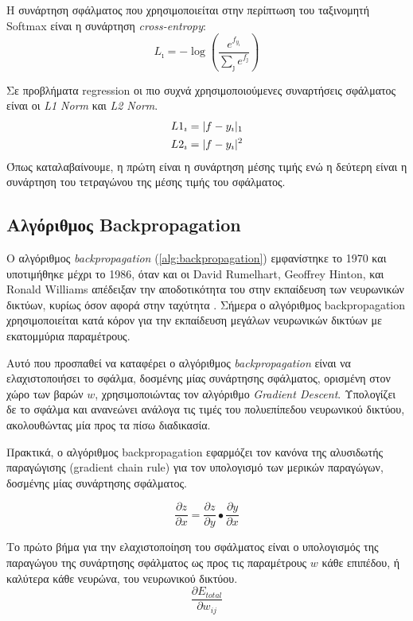 Η συνάρτηση σφάλματος που χρησιμοποιείται στην περίπτωση του ταξινομητή Softmax 
είναι η συνάρτηση \emph{cross-entropy}:
\begin{equation*}
  L_{\imath} = - \log{(\frac{e^{f_{y_{\imath}}}}{\sum_{\jmath}^{} e^{f_{\jmath}}})}
\end{equation*}


Σε προβλήματα regression οι πιο συχνά χρησιμοποιούμενες συναρτήσεις
σφάλματος είναι οι \emph{L1 Norm} και \emph{L2 Norm}.
\begin{gather*}
  L1_{\imath} = \lvert f - y_{\imath}\rvert_{1} \\
  L2_{\imath} = \lvert f - y_{\imath}\rvert^{2}
\end{gather*}
Όπως καταλαβαίνουμε, η πρώτη είναι η συνάρτηση μέσης τιμής ενώ η δεύτερη
είναι η συνάρτηση του τετραγώνου της μέσης τιμής του σφάλματος.

\subsection{Αλγόριθμος Backpropagation}

Ο αλγόριθμος \emph{backpropagation} (\autoref{alg:backpropagation}) εμφανίστηκε το 1970 και υποτιμήθηκε
μέχρι το 1986, όταν και οι David Rumelhart, Geoffrey Hinton, και Ronald Williams
απέδειξαν την αποδοτικότητα του στην εκπαίδευση των νευρωνικών δικτύων, κυρίως
όσον αφορά στην ταχύτητα \cite{rumelhart1988learning}.
Σήμερα ο αλγόριθμος backpropagation χρησιμοποιείται κατά κόρον για την εκπαίδευση
μεγάλων νευρωνικών δικτύων με εκατομμύρια παραμέτρους.

Αυτό που προσπαθεί να καταφέρει ο αλγόριθμος \emph{backpropagation} είναι να
ελαχιστοποιήσει το σφάλμα, δοσμένης μίας συνάρτησης σφάλματος, ορισμένη στον χώρο
των βαρών $w$, χρησιμοποιώντας τον αλγόριθμο \emph{Gradient Descent}.
Υπολογίζει δε το σφάλμα και ανανεώνει ανάλογα τις τιμές του
πολυεπίπεδου νευρωνικού δικτύου, ακολουθώντας μία προς τα πίσω διαδικασία.

Πρακτικά, ο αλγόριθμος backpropagation εφαρμόζει τον κανόνα
της αλυσιδωτής παραγώγισης (gradient chain rule) για τον υπολογισμό των
μερικών παραγώγων, δοσμένης μίας συνάρτησης σφάλματος.

\begin{equation*}
  \frac{\partial z}{\partial x} = \frac{\partial z}{\partial y}\bullet\frac{\partial y}{\partial x}
\end{equation*}

Το πρώτο βήμα για την ελαχιστοποίηση του σφάλματος είναι ο υπολογισμός
της παραγώγου της συνάρτησης σφάλματος ως προς τις παραμέτρους $w$ κάθε επιπέδου,
ή καλύτερα κάθε νευρώνα, του νευρωνικού δικτύου.
\begin{equation*}
  \frac{\partial E_{total}}{\partial w_{ij}}
\end{equation*}

